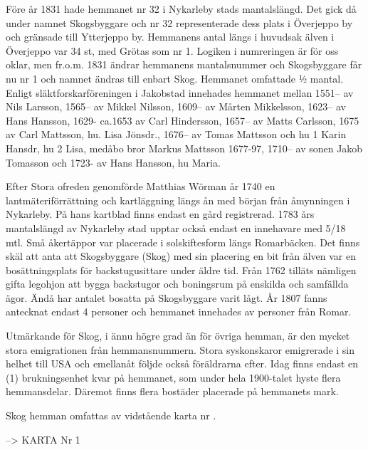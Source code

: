 
Före år 1831 hade hemmanet nr 32 i Nykarleby stads mantalslängd. Det gick då under namnet Skogsbyggare och nr 32 representerade dess plats i Överjeppo by och gränsade till Ytterjeppo by. Hemmanens antal längs i huvudsak älven i Överjeppo var 34 st, med Grötas som nr 1. Logiken i numreringen är för oss oklar, men fr.o.m. 1831 ändrar hemmanens mantalsnummer och Skogsbyggare får nu nr 1 och namnet ändras till enbart Skog. Hemmanet omfattade ½ mantal. Enligt släktforskarföreningen i Jakobstad innehades hemmanet mellan 1551-- av Nils Larsson, 1565-- av Mikkel Nilsson, 1609-- av Mårten Mikkelsson, 1623-- av Hans Hansson, 1629- ca.1653 av Carl Hindersson, 1657-- av Matts Carlsson, 1675 av  Carl Mattsson, hu. Lisa Jönsdr., 1676-- av Tomas Mattsson och hu 1 Karin Hansdr, hu 2 Lisa, medåbo bror Markus Mattsson 1677-97, 1710-- av sonen Jakob Tomasson och 1723- av Hans Hansson, hu Maria.

Efter Stora ofreden genomförde Matthias Wörman år 1740 en lantmäteriförrättning och kartläggning längs ån med början från åmynningen i Nykarleby. På hans kartblad finns endast en gård registrerad. 1783 års mantalslängd av Nykarleby stad upptar också endast en innehavare med 5/18 mtl. Små åkertäppor var placerade i solskiftesform längs Romarbäcken. Det finns skäl att anta att Skogsbyggare (Skog) med sin placering en bit från älven var en bosättningsplats för backstugusittare under äldre tid. Från 1762 tilläts nämligen gifta legohjon att bygga backstugor och boningsrum på enskilda och samfällda ägor. Ändå har antalet bosatta på Skogsbyggare varit lågt. År 1807 fanns antecknat endast 4 personer och hemmanet innehades av personer från Romar.

Utmärkande för Skog, i ännu högre grad än för övriga hemman, är den mycket stora emigrationen från hemmansnummern. Stora syskonskaror emigrerade i sin helhet till USA och emellanåt följde också föräldrarna efter. Idag finns endast en (1) brukningsenhet kvar på hemmanet, som under hela 1900-talet hyste flera hemmansdelar. Däremot finns flera bostäder placerade på hemmanets mark.

Skog hemman omfattas av vidstående karta nr .


--> KARTA Nr 1







